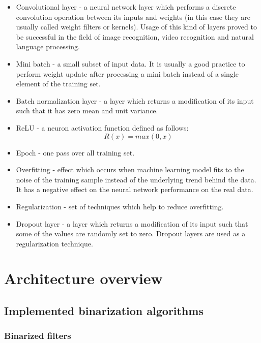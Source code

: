 \documentclass[licencjacka]{pracamgr}
\begin{document}
\begin{itemize}
        \item Convolutional layer - a neural network layer which performs a discrete convolution operation between its inputs and weights (in this case they are usually called weight filters or kernels). Usage of this kind of layers proved to be successful in the field of image recognition, video recognition and natural language processing. 	
               
        \item Mini batch - a small subset of input data. It is usually a good practice to perform weight update after processing a mini batch instead of a single element of the training set.
        
        \item Batch normalization layer - a layer which returns a modification of its input such 
        that it has zero mean and unit variance.
        
        \item ReLU - a neuron activation function defined as follows: $$ R(x) = max(0,x) $$
        
        \item Epoch - one pass over all training set.
        
        \item Overfitting - effect which occurs when machine learning model fits to the noise of the training sample instead of the underlying trend behind the data. It has a negative effect on the neural network performance on the real data.
        
        \item Regularization - set of techniques which help to reduce overfitting.
        
        \item Dropout layer - a layer which returns a modification of its input such that some of the values are randomly set to zero. Dropout layers are used as a regularization technique.   
    \end{itemize}
\part{Architecture overview}
\chapter{Implemented binarization algorithms}
	\section{Binarized filters}
\end{document}
